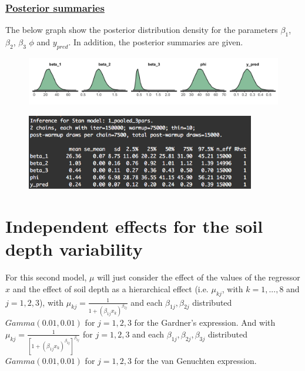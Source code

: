 \documentclass{article}
\begin{document}
\subsubsection*{\underline{Posterior summaries}}
The below graph show the posterior distribution density for the parameters $\beta_1$, $\beta_2$, $\beta_3$ $\phi$ and $y_{pred}$. In addition, the posterior summaries are given.
\begin{figure}[ht!]
\centering
\includegraphics[width=16cm]{pooled_3pars_dens.png}
\end{figure}

\begin{figure}[ht!]
\centering
\includegraphics[width=10cm]{p02.png}
\end{figure}



\newpage
\section{Independent effects for the soil depth variability}
For this second model, $\mu$ will just consider the effect of the values of the regressor $x$ and the effect of soil depth as a hierarchical effect (i.e. $\mu_{kj}$, with $k = 1,..., 8$ and $j = 1,2,3$), with $\mu_{kj} = \frac{1}{1+(\beta_{1j} x_k)^{\beta_{2j}}}$ and each $\beta_{1j}, \beta_{2j}$ distributed $Gamma(0.01, 0.01)$ for $j = 1,2,3$ for the Gardner’s expression. And with $\mu_{kj} = \frac{1}{[1+(\beta_{1j} x_k)^{\beta_{2j}}]^{\beta_{3j}}}$ for $j = 1,2,3$ and each $\beta_{1j}, \beta_{2j}, \beta_{3j}$ distributed $Gamma(0.01, 0.01)$ for $j = 1,2,3$ for the van Genuchten expression.
\end{document}
